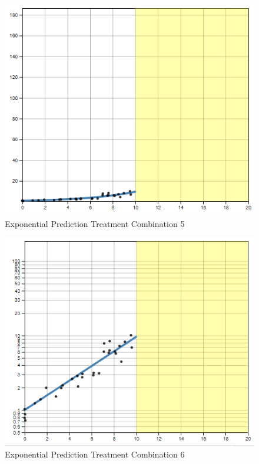 \documentclass[print]{nuthesis}
\begin{document}
\begin{figure}[tbp]

{\centering \includegraphics[width=0.75\linewidth,]{images/high-10-linear} 

}

\caption{Exponential Prediction Treatment Combination 5}\label{fig:high-10-linear}
\end{figure}

\begin{figure}[tbp]

{\centering \includegraphics[width=0.75\linewidth,]{images/high-10-log} 

}

\caption{Exponential Prediction Treatment Combination 6}\label{fig:high-10-log}
\end{figure}
\end{document}
